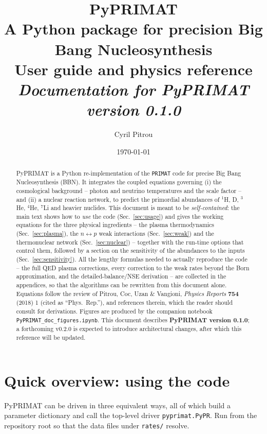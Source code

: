 \documentclass[11pt,a4paper]{article}
\title{\textbf{PyPRIMAT}\\[2pt]
       \large A Python package for precision Big Bang Nucleosynthesis\\[6pt]
       \normalsize User guide and physics reference\\[4pt]
       \normalsize\textit{Documentation for PyPRIMAT version 0.1.0}}
\author{Cyril Pitrou}
\date{\today}
\newcommand{\code}[1]{\texttt{#1}}
\newcommand{\PR}{Phys.\ Rep.}
\begin{document}
\maketitle

\begin{abstract}
\noindent
PyPRIMAT is a Python re-implementation of the \code{PRIMAT} code for precise
Big Bang Nucleosynthesis (BBN). It integrates the coupled equations governing
(i) the cosmological background -- photon and neutrino temperatures and the
scale factor -- and (ii) a nuclear reaction network, to predict the primordial
abundances of $^{1}$H, D, $^{3}$He, $^{4}$He, $^{7}$Li and heavier nuclides.
This document is meant to be \emph{self-contained}: the main text shows how to
\emph{use} the code (Sec.~\ref{sec:usage}) and gives the working equations for
the three physical ingredients -- the plasma thermodynamics
(Sec.~\ref{sec:plasma}), the $n\leftrightarrow p$ weak interactions
(Sec.~\ref{sec:weak}) and the thermonuclear network (Sec.~\ref{sec:nuclear}) --
together with the run-time options that control them, followed by a section on
the sensitivity of the abundances to the inputs (Sec.~\ref{sec:sensitivity}).
All the lengthy formulas needed to actually reproduce the code -- the full QED
plasma corrections, every correction to the weak rates beyond the Born
approximation, and the detailed-balance/NSE derivation -- are collected in the
appendices, so that the algorithms can be rewritten from this document alone.
Equations follow the review of Pitrou, Coc, Uzan \& Vangioni,
\emph{Physics Reports} \textbf{754} (2018) 1 \cite{PhysRep2018} (cited as
``\PR''), and references therein, which the reader should consult for
derivations.  Figures are produced by the companion notebook
\code{PyPRIMAT\_doc\_figures.ipynb}. This document describes \textbf{PyPRIMAT
version 0.1.0}; a forthcoming v0.2.0 is expected to introduce architectural
changes, after which this reference will be updated.
\end{abstract}

\tableofcontents

\section{Quick overview: using the code}\label{sec:usage}

PyPRIMAT can be driven in three equivalent ways, all of which build a parameter
dictionary and call the top-level driver \code{pyprimat.PyPR}. Run from the
repository root so that the data files under \code{rates/} resolve.
\end{document}
